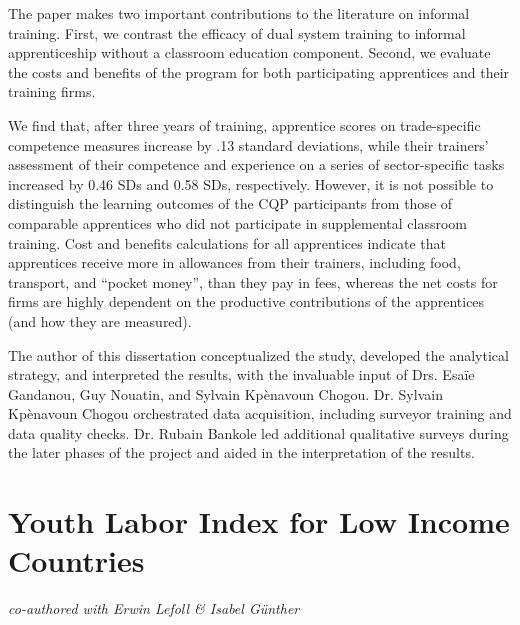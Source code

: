 \documentclass[
  a4paper, twoside, 12pt]{book}
\newcommand{\newsection}{\setcounter{figure}{0}
\renewcommand{\thefigure}{\arabic{chapter}.\arabic{figure}}
\setcounter{table}{0}
\renewcommand{\thetable}{\arabic{chapter}.\arabic{table}}}
\renewcommand{\hl}[1]{#1}
\begin{document}
The paper makes two important contributions to the literature on informal training. First, we contrast the efficacy of dual system training to informal apprenticeship without a classroom education component. Second, we evaluate the costs and benefits of the program for both participating apprentices and their training firms.

We find that, after three years of training, apprentice scores on trade-specific competence measures increase by .13 standard deviations, while their trainers' assessment of their competence and experience on a series of sector-specific tasks increased by 0.46 SDs and 0.58 SDs, respectively. However, it is not possible to distinguish the learning outcomes of the CQP participants from those of comparable apprentices who did not participate in supplemental classroom training. Cost and benefits calculations for all apprentices indicate that apprentices receive more in allowances from their trainers, including food, transport, and ``pocket money'', than they pay in fees, whereas the net costs for firms are highly dependent on the productive contributions of the apprentices (and how they are measured).

\hl{The author of this dissertation conceptualized the study, developed the analytical strategy, and interpreted the results, with the invaluable input of Drs. Esaïe Gandanou, Guy Nouatin, and Sylvain Kpènavoun Chogou. Dr. Sylvain Kpènavoun Chogou orchestrated data acquisition, including surveyor training and data quality checks. Dr. Rubain Bankole led additional qualitative surveys during the later phases of the project and aided in the interpretation of the results.}

\newpage
{}
\printbibliography[segment=\therefsegment,heading=subbibintoc,title={References}]

\newsection

\chapter{Youth Labor Index for Low Income Countries}

\emph{co-authored with Erwin Lefoll \& Isabel Günther}
\end{document}
